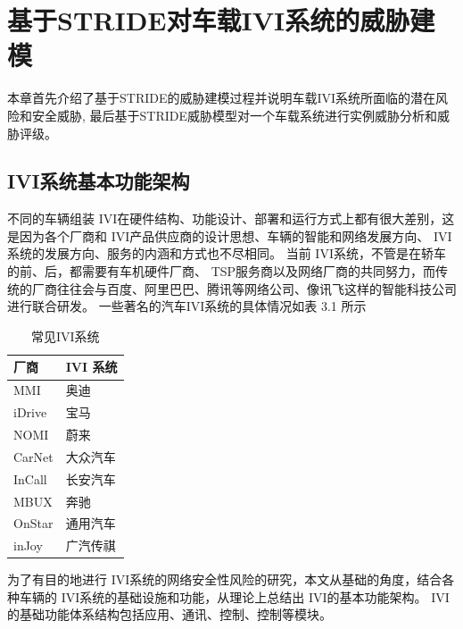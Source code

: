 \chapter{基于STRIDE对车载IVI系统的威胁建模}
\label{ch3}
本章首先介绍了基于STRIDE的威胁建模过程并说明车载IVI系统所面临的潜在风险和安全威胁, 最后基于STRIDE威胁模型对一个车载系统进行实例威胁分析和威胁评级。

\section{IVI系统基本功能架构}
不同的车辆组装 IVI在硬件结构、功能设计、部署和运行方式上都有很大差别，这是因为各个厂商和 IVI产品供应商的设计思想、车辆的智能和网络发展方向、 IVI系统的发展方向、服务的内涵和方式也不尽相同。
当前 IVI系统，不管是在轿车的前、后，都需要有车机硬件厂商、 TSP服务商以及网络厂商的共同努力，而传统的厂商往往会与百度、阿里巴巴、腾讯等网络公司、像讯飞这样的智能科技公司进行联合研发。
一些著名的汽车IVI系统的具体情况如表 3.1 所示
\begin{table}
  \caption{常见IVI系统}
\begin{center}
  \begin{tabular}{|l|l|}
    \hline 厂商 & IVI 系统 \\
    \hline MMI & 奥迪 \\
    \hline iDrive & 宝马 \\
    \hline NOMI & 蔚来 \\
    \hline CarNet & 大众汽车 \\
    \hline InCall & 长安汽车 \\
    \hline MBUX & 奔驰 \\
    \hline OnStar & 通用汽车 \\
    \hline inJoy & 广汽传祺 \\
    \hline
    \end{tabular}
\end{center}
\end{table}
为了有目的地进行 IVI系统的网络安全性风险的研究，本文从基础的角度，结合各种车辆的 IVI系统的基础设施和功能，从理论上总结出 IVI的基本功能架构。
IVI的基础功能体系结构包括应用、通讯、控制、控制等模块。

